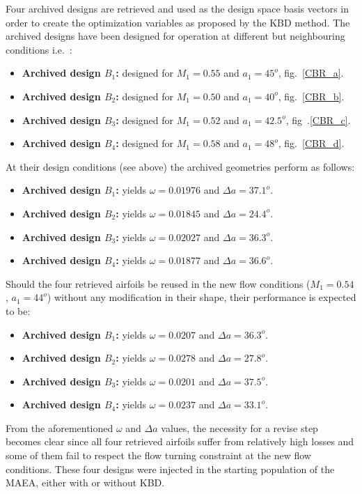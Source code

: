Four archived designs are retrieved and used as the design space basis vectors in order to create the optimization variables as proposed by the KBD method. 
\pagebreak
The archived designs have been designed for operation at different but neighbouring conditions i.e.\ :
\begin{itemize}
\item{\textbf{Archived design $B_1$:}} designed for $M_1=0.55$ and $a_1=45^o$, fig.\ \ref{CBR_a}.
\item{\textbf{Archived design $B_2$:}} designed for $M_1=0.50$ and $a_1=40^o$, fig.\ \ref{CBR_b}.
\item{\textbf{Archived design $B_3$:}} designed for $M_1=0.52$ and $a_1=42.5^o$, fig\ .\ref{CBR_c}. 
\item{\textbf{Archived design $B_4$:}} designed for $M_1=0.58$ and $a_1=48^o$, fig.\ \ref{CBR_d}.
\end{itemize}
At their design conditions (see above) the archived geometries perform as follows: 
\begin{itemize}
\item{\textbf{Archived design $B_1$:}} yields $\omega=0.01976$ and $\Delta a=37.1^o$.
\item{\textbf{Archived design $B_2$:}} yields $\omega=0.01845$ and $\Delta a=24.4^o$.
\item{\textbf{Archived design $B_3$:}} yields $\omega=0.02027$ and $\Delta a=36.3^o$.
\item{\textbf{Archived design $B_4$:}} yields $\omega=0.01877$ and $\Delta a=36.6^o$.
\end{itemize}
Should the four retrieved airfoils be reused in the new flow conditions ($M_1=0.54$, $a_1=44^o$) without any modification in their shape, their performance is expected to be:
\begin{itemize}
\item{\textbf{Archived design $B_1$:}} yields $\omega=0.0207$ and $\Delta a=36.3^o$.
\item{\textbf{Archived design $B_2$:}} yields $\omega=0.0278$ and $\Delta a=27.8^o$.
\item{\textbf{Archived design $B_3$:}} yields $\omega=0.0201$ and $\Delta a=37.5^o$.
\item{\textbf{Archived design $B_4$:}} yields $\omega=0.0237$ and $\Delta a=33.1^o$.
\end{itemize}
From the aforementioned $\omega$ and $\Delta a$ values, the necessity for a revise step becomes clear since all four retrieved airfoils suffer from relatively high losses and some of them fail to respect the flow turning constraint at the new flow conditions. These four designs were injected in the starting population of the MAEA, either with or without KBD.  

